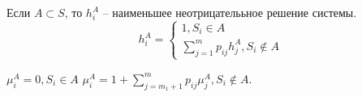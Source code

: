 \begin{theorem}
  Если $A \subset S$, то $h_i^A$ -- наименьшее неотрицателььное решение системы.
  \[
    h^A_i = \begin{cases}
      1, S_i \in A \\
      \sum_{j=1}^m p_{ij} h_j^A, S_i \notin A
    \end{cases}
  \]

  $\mu^A_i = 0, S_i \in A$
  $\mu^A_i = 1 + \sum_{j=m_1+1}^{m} p_{ij} \mu_j^A, S_i \notin A$.
\end{theorem}

